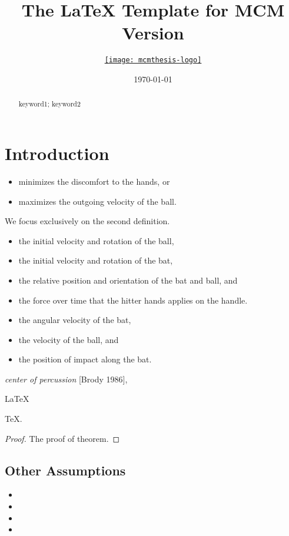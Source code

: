 \documentclass{mcmthesis}
\title{The \LaTeX{} Template for MCM Version \MCMversion}
\author{\small \href{http://www.latexstudio.net/}
  {\texttt{[image: mcmthesis-logo]}}}
\date{\today}
\begin{document}
\begin{abstract}
\lipsum[1]
\begin{keywords}
keyword1; keyword2
\end{keywords}
\end{abstract}
\maketitle
\section{Introduction}

\lipsum[2]
\begin{itemize}
\item minimizes the discomfort to the hands, or
\item maximizes the outgoing velocity of the ball.
\end{itemize}
We focus exclusively on the second definition.

\begin{itemize}
\item the initial velocity and rotation of the ball,
\item the initial velocity and rotation of the bat,
\item the relative position and orientation of the bat and ball, and
\item the force over time that the hitter hands applies on the handle.
\end{itemize}
\lipsum[3]
\begin{itemize}
\item the angular velocity of the bat,
\item the velocity of the ball, and
\item the position of impact along the bat.
\end{itemize}
\lipsum[4]
\emph{center of percussion} [Brody 1986], \lipsum[5]

\begin{Theorem} \label{thm:latex}
\LaTeX
\end{Theorem}
\begin{Lemma} \label{thm:tex}
\TeX .
\end{Lemma}
\begin{proof}
The proof of theorem.
\end{proof}

\subsection{Other Assumptions}
\lipsum[6]
\begin{itemize}
\item
\item
\item
\item
\end{itemize}
\end{document}
